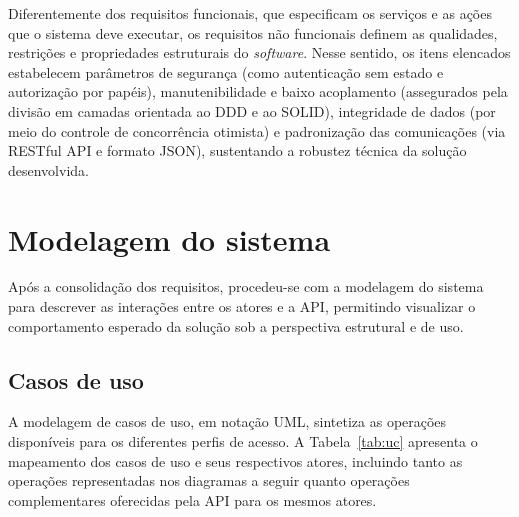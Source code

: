 Diferentemente dos requisitos funcionais, que especificam os serviços e as ações que o sistema deve executar, os requisitos não funcionais definem as qualidades, restrições e propriedades estruturais do \textit{software}. Nesse sentido, os itens elencados estabelecem parâmetros de segurança (como autenticação sem estado e autorização por papéis), manutenibilidade e baixo acoplamento (assegurados pela divisão em camadas orientada ao DDD e ao SOLID), integridade de dados (por meio do controle de concorrência otimista) e padronização das comunicações (via RESTful API e formato JSON), sustentando a robustez técnica da solução desenvolvida.


\section{Modelagem do sistema}

Após a consolidação dos requisitos, procedeu-se com a modelagem do sistema para descrever as interações entre os atores e a API, permitindo visualizar o comportamento esperado da solução sob a perspectiva estrutural e de uso.

\subsection{Casos de uso}

A modelagem de casos de uso, em notação UML, sintetiza as operações disponíveis para os diferentes perfis de acesso. A Tabela~\ref{tab:uc} apresenta o mapeamento dos casos de uso e seus respectivos atores, incluindo tanto as operações representadas nos diagramas a seguir quanto operações complementares oferecidas pela API para os mesmos atores.

